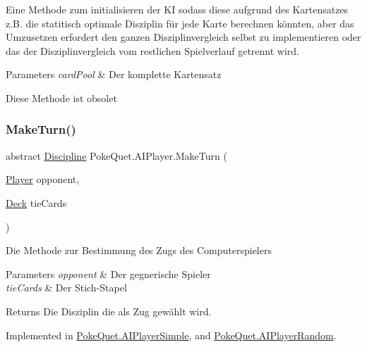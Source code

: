 Eine Methode zum initialisieren der KI sodass diese aufgrund des Kartensatzes z.\+B. die statitisch optimale Disziplin für jede Karte berechnen könnten, aber das Umzusetzen erfordert den ganzen Disziplinvergleich selbst zu implementieren oder das der Disziplinvergleich vom restlichen Spielverlauf getrennt wird. 


\begin{DoxyParams}{Parameters}
{\em card\+Pool} & Der komplette Kartensatz\\
\hline
\end{DoxyParams}


Diese Methode ist obsolet\mbox{\label{class_poke_quet_1_1_a_i_player_ae2862ead657c524614793ea4d3ebf80b}} 
\subsubsection{\texorpdfstring{Make\+Turn()}{MakeTurn()}}
{\footnotesize\ttfamily abstract \mbox{\hyperlink{namespace_poke_quet_aa425f1b8cf90847021fe1177d6a7199d}{Discipline}} Poke\+Quet.\+A\+I\+Player.\+Make\+Turn (\begin{DoxyParamCaption}\item[{\mbox{\hyperlink{class_poke_quet_1_1_player}{Player}}}]{opponent,  }\item[{\mbox{\hyperlink{class_poke_quet_1_1_deck}{Deck}}}]{tie\+Cards }\end{DoxyParamCaption})\hspace{0.3cm}{\ttfamily [pure virtual]}}



Die Methode zur Bestimmung des Zugs des Computerspielers 


\begin{DoxyParams}{Parameters}
{\em opponent} & Der gegnerische Spieler\\
\hline
{\em tie\+Cards} & Der Stich-\/\+Stapel\\
\hline
\end{DoxyParams}
\begin{DoxyReturn}{Returns}
Die Disziplin die als Zug gewählt wird.
\end{DoxyReturn}


Implemented in \mbox{\hyperlink{class_poke_quet_1_1_a_i_player_simple_a4c48360666f3fc8b7400cbfa2c7ea29e}{Poke\+Quet.\+A\+I\+Player\+Simple}}, and \mbox{\hyperlink{class_poke_quet_1_1_a_i_player_random_a8723ee791e3ac1ea34033cd6ce49398f}{Poke\+Quet.\+A\+I\+Player\+Random}}.



